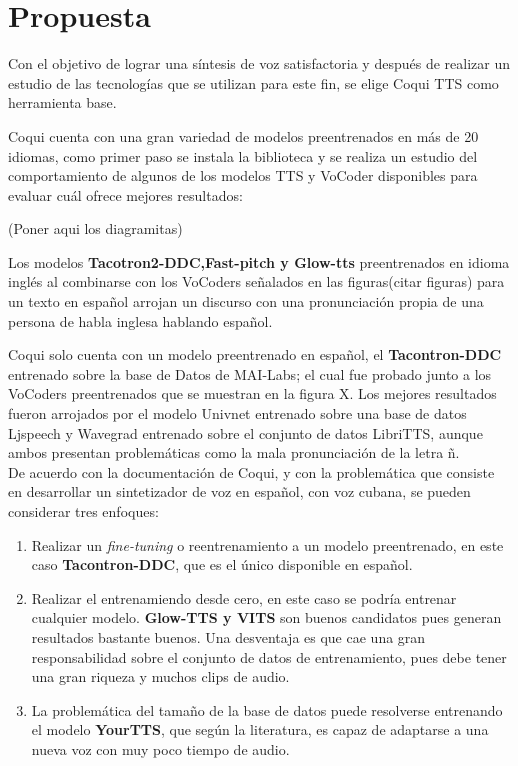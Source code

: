 \chapter{Propuesta}\label{chapter:proposal}

Con el objetivo de lograr una síntesis de voz satisfactoria y después de realizar un estudio de las tecnologías que se utilizan para este fin, se elige Coqui TTS como herramienta base.

Coqui cuenta con una gran variedad de modelos preentrenados en más de 20 idiomas, como primer paso se instala la biblioteca y se realiza un estudio del comportamiento de algunos de los modelos TTS y VoCoder disponibles para evaluar cuál ofrece mejores resultados:

(Poner aqui los diagramitas)

Los modelos \textbf{Tacotron2-DDC,Fast-pitch y Glow-tts} preentrenados en idioma inglés al combinarse con los VoCoders señalados en las figuras(citar figuras) para un texto en español arrojan un discurso con una pronunciación propia de una persona de habla inglesa hablando español.

Coqui solo cuenta con un modelo preentrenado en español, el \textbf{Tacontron-DDC} entrenado sobre la base de Datos de MAI-Labs; el cual fue probado junto a los VoCoders preentrenados que se muestran en la figura X. Los mejores resultados fueron arrojados por el modelo Univnet entrenado sobre una base de datos Ljspeech y Wavegrad entrenado sobre el conjunto de datos LibriTTS, aunque ambos presentan problemáticas como la mala pronunciación de la letra ñ.\\

De acuerdo con la documentación de Coqui, y con la problemática que consiste en desarrollar un sintetizador de voz en español, con voz cubana, se pueden considerar tres enfoques:

\begin{enumerate}
	\item Realizar un \textit{fine-tuning} o reentrenamiento a un modelo preentrenado, en este caso \textbf{Tacontron-DDC}, que es el único disponible en español. 
	
	\item Realizar el entrenamiendo desde cero, en este caso se podría entrenar cualquier modelo. \textbf{Glow-TTS y VITS} son buenos candidatos pues generan resultados bastante buenos. Una desventaja es que cae una gran responsabilidad sobre el conjunto de datos de entrenamiento, pues debe tener una gran riqueza y muchos clips de audio.
	
	\item La problemática del tamaño de la base de datos puede resolverse entrenando el modelo \textbf{YourTTS}, que según la literatura, es capaz de adaptarse a una nueva voz con muy poco tiempo de audio.
\end{enumerate}

